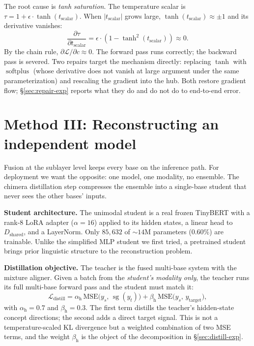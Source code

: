 \documentclass[10pt]{article}
\newcommand{\stopgrad}{\operatorname{sg}}
\newcommand{\softplus}{\operatorname{softplus}}
\theoremstyle{definition}
\theoremstyle{plain}
\theoremstyle{remark}
\begin{document}
The root cause is \emph{tanh saturation}. The temperature scalar is $\tau = 1 + \epsilon \cdot \tanh(t_{\text{scalar}})$. When $|t_{\text{scalar}}|$ grows large, $\tanh(t_{\text{scalar}}) \approx \pm 1$ and its derivative vanishes:
\begin{equation}
\frac{\partial \tau}{\partial t_{\text{scalar}}} = \epsilon \cdot (1 - \tanh^2(t_{\text{scalar}})) \approx 0 .
\end{equation}
By the chain rule, $\partial \mathcal{L}/\partial c \approx 0$. The forward pass runs correctly; the backward pass is severed. Two repairs target the mechanism directly: replacing $\tanh$ with $\softplus$ (whose derivative does not vanish at large argument under the same parameterization) and rescaling the gradient into the hub. Both restore gradient flow; \S\ref{sec:repair-exp} reports what they do and do not do to end-to-end error.

\section{Method III: Reconstructing an independent model}
\label{sec:distill}

Fusion at the sublayer level keeps every base on the inference path. For deployment we want the opposite: one model, one modality, no ensemble. The chimera distillation step compresses the ensemble into a single-base student that never sees the other bases' inputs.

\textbf{Student architecture.} The unimodal student is a real frozen TinyBERT \citep{jiao2020} with a rank-8 LoRA adapter ($\alpha{=}16$) applied to its hidden states, a linear head to $D_{\text{shared}}$, and a LayerNorm. Only $85{,}632$ of ${\sim}14$M parameters ($0.60\%$) are trainable. Unlike the simplified MLP student we first tried, a pretrained student brings prior linguistic structure to the reconstruction problem.

\textbf{Distillation objective.} The teacher is the fused multi-base system with the mixture aligner. Given a batch from the \emph{student's modality only}, the teacher runs its full multi-base forward pass and the student must match it:
\begin{equation}
\label{eq:distill}
\mathcal{L}_{\text{distill}} = \alpha_{\text{h}} \, \mathrm{MSE}\big(y_s,\, \stopgrad(y_t)\big) + \beta_{\text{h}} \, \mathrm{MSE}\big(y_s,\, y_{\text{target}}\big),
\end{equation}
with $\alpha_{\text{h}} = 0.7$ and $\beta_{\text{h}} = 0.3$. The first term distills the teacher's hidden-state concept directions; the second adds a direct target signal. This is not a temperature-scaled KL divergence but a weighted combination of two MSE terms, and the weight $\beta_{\text{h}}$ is the object of the decomposition in \S\ref{sec:distill-exp}.
\end{document}
